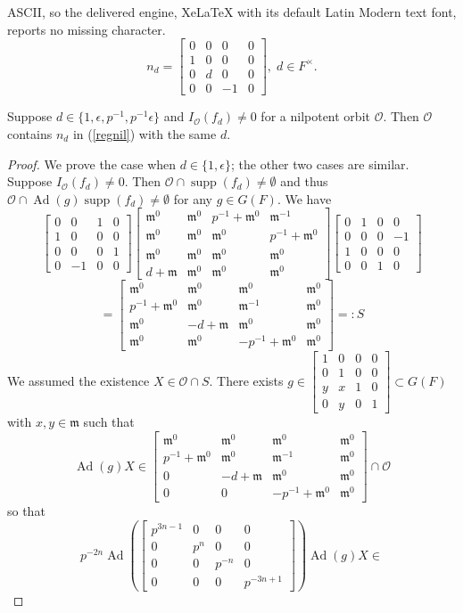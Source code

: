 \documentclass[10pt,a4paper]{amsart}
\newcommand{\Ad}{\operatorname{Ad}}
\newcommand{\cO}{\mathcal{O}}
\newcommand{\fm}{\mathfrak{m}}
\newcommand{\matr}[1]{\left[\begin{matrix}#1\end{matrix}\right]}
\newcommand{\supp}{\operatorname{supp}}
\begin{document}
ASCII, so the delivered engine, XeLaTeX with its default Latin Modern text font, reports no missing character.
\begin{equation}\label{regnil}
n_d=\matr{
	0&0&0&0\\
	1&0&0&0\\
	0&d&0&0\\
	0&0&-1&0
},\; d\in F^{\times}.
\end{equation}

\begin{lemma} Suppose $d\in\{1,\epsilon,p^{-1},p^{-1}\epsilon\}$ and $I_{\cO}(f_d)\not=0$ for a nilpotent orbit $\cO$. Then $\cO$ contains $n_d$ in (\ref{regnil}) with the same $d$.
\end{lemma}

\begin{proof} We prove the case when $d\in\{1,\epsilon\}$; the other two cases are similar. Suppose $I_{\cO}(f_d)\not=0$. Then $\cO\cap\supp(f_d)\not=\emptyset$ and thus $\cO\cap\Ad(g)\supp(f_d)\not=\emptyset$ for any $g\in G(F)$. We have
	\[
	\matr{
		0&0&1&0\\
		1&0&0&0\\
		0&0&0&1\\
		0&-1&0&0
	}
	\matr{
		\fm^0&\fm^0&p^{-1}+\fm^0&\fm^{-1}\\
		\fm^0&\fm^0&\fm^0&p^{-1}+\fm^0\\
		\fm^0&\fm^0&\fm^0&\fm^0\\
		d+\fm&\fm^0&\fm^0&\fm^0
	}
	\matr{
		0&1&0&0\\
		0&0&0&-1\\
		1&0&0&0\\
		0&0&1&0
	}
	\]
	\[
	=\matr{
		\fm^0&\fm^0&\fm^0&\fm^0\\
		p^{-1}+\fm^0&\fm^0&\fm^{-1}&\fm^0\\
		\fm^0&-d+\fm&\fm^0&\fm^0\\
		\fm^0&\fm^0&-p^{-1}+\fm^0&\fm^0
	}=:S
	\]
	We assumed the existence $X\in \cO\cap S$. There exists $g\in\matr{1&0&0&0\\0&1&0&0\\y&x&1&0\\0&y&0&1}\subset G(F)$ with $x,y\in\fm$ such that
	\[
	\Ad(g)X\in\matr{
		\fm^0&\fm^0&\fm^0&\fm^0\\
		p^{-1}+\fm^0&\fm^0&\fm^{-1}&\fm^0\\
		0&-d+\fm&\fm^0&\fm^0\\
		0&0&-p^{-1}+\fm^0&\fm^0
	}\cap\cO
	\]
	so that
	\[
	p^{-2n}\Ad(\matr{p^{3n-1}&0&0&0\\0&p^n&0&0\\0&0&p^{-n}&0\\0&0&0&p^{-3n+1}})\Ad(g)X\in
\]
\end{proof}
\end{document}
